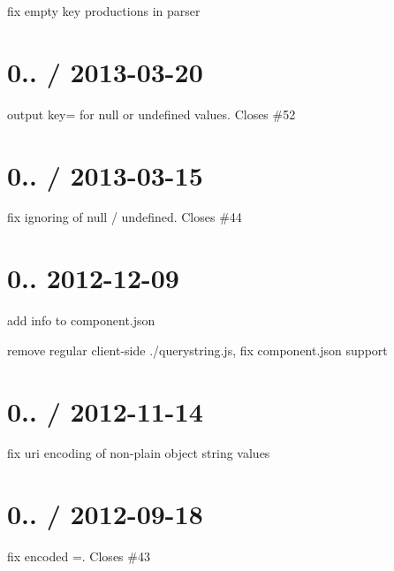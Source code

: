
\begin{DoxyItemize}
\item fix empty key productions in parser
\end{DoxyItemize}

\section*{0.. / 2013-\/03-\/20 }


\begin{DoxyItemize}
\item output key= for null or undefined values. Closes \#52
\end{DoxyItemize}

\section*{0.. / 2013-\/03-\/15 }


\begin{DoxyItemize}
\item fix ignoring of null / undefined. Closes \#44
\end{DoxyItemize}

\section*{0.. 2012-\/12-\/09 }


\begin{DoxyItemize}
\item add info to component.\+json
\item remove regular client-\/side ./querystring.js, fix component.\+json support
\end{DoxyItemize}

\section*{0.. / 2012-\/11-\/14 }


\begin{DoxyItemize}
\item fix uri encoding of non-\/plain object string values
\end{DoxyItemize}

\section*{0.. / 2012-\/09-\/18 }


\begin{DoxyItemize}
\item fix encoded {\ttfamily =}. Closes \#43
\end{DoxyItemize}

